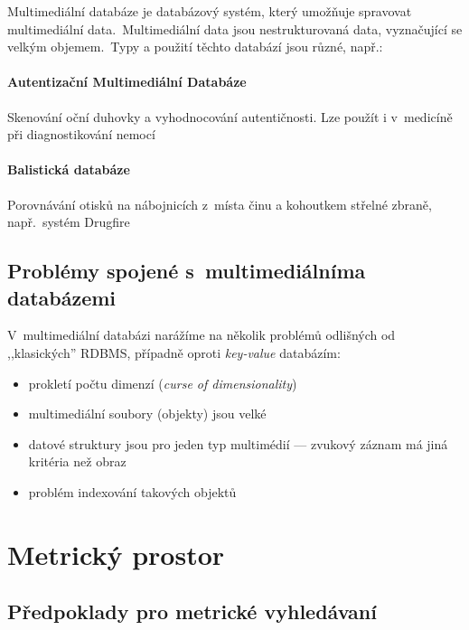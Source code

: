 Multimediální databáze je databázový systém, který umožňuje spravovat
multimediální data\@.~Multimediální data jsou nestrukturovaná data,
vyznačující se velkým objemem\@.~Typy a použití těchto databází
jsou různé, např.:


\paragraph{Autentizační Multimediální Databáze}

Skenování oční duhovky a vyhodnocování autentičnosti\@. Lze použít
i v~medicíně při diagnostikování nemocí


\paragraph{Balistická databáze}

Porovnávání otisků na nábojnicích z~místa činu a kohoutkem střelné
zbraně, např.~systém Drugfire\cite{drugfire}




\subsection{Problémy spojené s~multimediálníma databázemi}

V~multimediální databázi narážíme na několik problémů odlišných od
,,klasických'' RDBMS, případně oproti \emph{key-value }databázím\cite{no-sql}:
\begin{itemize}
\item prokletí počtu dimenzí (\emph{curse of dimensionality})\cite{Bellman195706}
\item multimediální soubory (objekty) jsou velké
\item datové struktury jsou pro jeden typ multimédií --- zvukový záznam
má jiná kritéria než obraz
\item problém indexování takových objektů
\end{itemize}

\section{Metrický prostor}


\subsection{Předpoklady pro metrické vyhledávaní}

